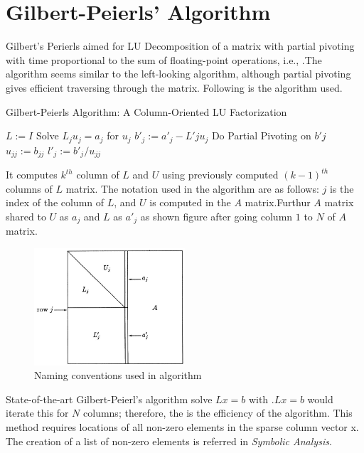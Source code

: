 \section{Gilbert-Peierls' Algorithm}
Gilbert's Perierls \cite{GPAlgo} aimed for LU Decomposition of a matrix with partial pivoting with time proportional to the sum of floating-point operations, i.e., .The algorithm seems similar to the left-looking algorithm, although partial pivoting gives efficient traversing through the matrix. Following is the algorithm used.

\begin{algorithm}
    \caption{Gilbert-Peierls Algorithm: A Column-Oriented LU Factorization
        \label{algo:GP}}
    \begin{algorithmic}[1]
        \Statex
        \State $L := I$
            \State Solve $L_j u_j = a_j$ for $u_j$
            \State $b'_j := a'_j - L'j u_j$
            \State Do Partial Pivoting on $b'j$
            \State $u_{jj} := b_{jj}$
            \State $l'_j := b'_j / u_{jj}$
        \EndFor
    \end{algorithmic}
\end{algorithm}

\pagebreak

It computes $k^{th}$ column of $L$ and $U$ using previously computed $(k-1)^{th}$ columns of $L$ matrix. The notation used in the algorithm are as follows:
$j$ is the index of the column of $L$, and $U$ is computed in the $A$ matrix.Furthur $A$ matrix shared to $U$ as $a_j$ and $L$ as $a'_j$ as shown figure after going column $1$ to $N$ of $A$ matrix.

\begin{figure}[H]
    \centering
    \includegraphics[width = 0.50\textwidth]{./Theory/gpConvention.JPG}
    \caption{Naming conventions used in algorithm}
    \label{fig:GP:namingConvention}
\end{figure}

State-of-the-art Gilbert-Peierl's algorithm \cite{GPAlgo} solve $Lx=b$ with .$Lx=b$ would iterate this for $N$ columns; therefore, the   is the efficiency of the algorithm.
This method requires locations of all non-zero elements in the sparse column vector x. The creation of a list of non-zero elements is referred in \textit{Symbolic Analysis}.

